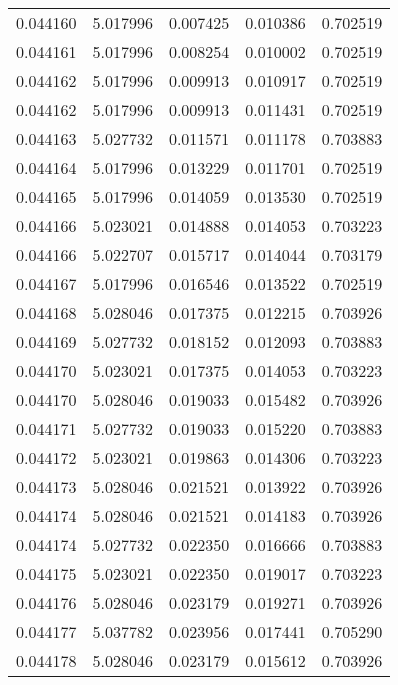 \begin{tabular}{lrrrr}
0.044160    &  5.017996 &  0.007425 &  0.010386 &             0.702519 \\
0.044161    &  5.017996 &  0.008254 &  0.010002 &             0.702519 \\
0.044162    &  5.017996 &  0.009913 &  0.010917 &             0.702519 \\
0.044162    &  5.017996 &  0.009913 &  0.011431 &             0.702519 \\
0.044163    &  5.027732 &  0.011571 &  0.011178 &             0.703883 \\
0.044164    &  5.017996 &  0.013229 &  0.011701 &             0.702519 \\
0.044165    &  5.017996 &  0.014059 &  0.013530 &             0.702519 \\
0.044166    &  5.023021 &  0.014888 &  0.014053 &             0.703223 \\
0.044166    &  5.022707 &  0.015717 &  0.014044 &             0.703179 \\
0.044167    &  5.017996 &  0.016546 &  0.013522 &             0.702519 \\
0.044168    &  5.028046 &  0.017375 &  0.012215 &             0.703926 \\
0.044169    &  5.027732 &  0.018152 &  0.012093 &             0.703883 \\
0.044170    &  5.023021 &  0.017375 &  0.014053 &             0.703223 \\
0.044170    &  5.028046 &  0.019033 &  0.015482 &             0.703926 \\
0.044171    &  5.027732 &  0.019033 &  0.015220 &             0.703883 \\
0.044172    &  5.023021 &  0.019863 &  0.014306 &             0.703223 \\
0.044173    &  5.028046 &  0.021521 &  0.013922 &             0.703926 \\
0.044174    &  5.028046 &  0.021521 &  0.014183 &             0.703926 \\
0.044174    &  5.027732 &  0.022350 &  0.016666 &             0.703883 \\
0.044175    &  5.023021 &  0.022350 &  0.019017 &             0.703223 \\
0.044176    &  5.028046 &  0.023179 &  0.019271 &             0.703926 \\
0.044177    &  5.037782 &  0.023956 &  0.017441 &             0.705290 \\
0.044178    &  5.028046 &  0.023179 &  0.015612 &             0.703926 \\

\end{tabular}
